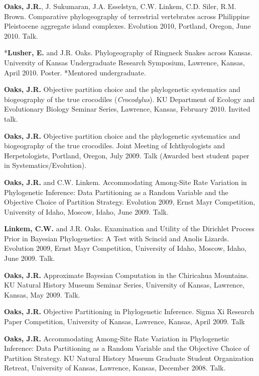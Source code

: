 \myHangIndent
{\bf Oaks, J.R.}, J. Sukumaran, J.A. Esselstyn, C.W. Linkem, C.D. Siler, R.M.
Brown.
Comparative phylogeography of terrestrial vertebrates across Philippine
Pleistocene aggregate island complexes.
Evolution 2010, Portland, Oregon, June 2010.
Talk.

\myHangIndent
*{\bf Lusher, E.} and J.R. Oaks.
Phylogeography of Ringneck Snakes across Kansas.
University of Kansas Undergraduate Research Symposium, Lawrence, Kansas, April
2010.
Poster.
*Mentored undergraduate.

\myHangIndent
{\bf Oaks, J.R.}
Objective partition choice and the phylogenetic systematics and biogeography of
the true crocodiles (\emph{Crocodylus}).
KU Department of Ecology and Evolutionary Biology Seminar Series, Lawrence,
Kansas, February 2010.
Invited talk.

\myHangIndent
{\bf Oaks, J.R.}
Objective partition choice and the phylogenetic systematics and biogeography of
the true crocodiles.
Joint Meeting of Ichthyologists and Herpetologists, Portland, Oregon, July
2009.
Talk (Awarded best student paper in Systematics/Evolution).

\myHangIndent
{\bf Oaks, J.R.} and C.W. Linkem.
Accommodating Among-Site Rate Variation in Phylogenetic Inference: Data
Partitioning as a Random Variable and the Objective Choice of Partition
Strategy.
Evolution 2009, Ernst Mayr Competition, University of Idaho, Moscow, Idaho,
June 2009.
Talk.

\myHangIndent
{\bf Linkem, C.W.} and J.R. Oaks.
Examination and Utility of the Dirichlet Process Prior in Bayesian
Phylogenetics: A Test with Scincid and Anolis Lizards.
Evolution 2009, Ernst Mayr Competition, University of Idaho, Moscow, Idaho,
June 2009.
Talk.

\myHangIndent
{\bf Oaks, J.R.}
Approximate Bayesian Computation in the Chiricahua Mountains.
KU Natural History Museum Seminar Series, University of Kansas, Lawrence,
Kansas, May 2009.
Talk.

\myHangIndent
{\bf Oaks, J.R.}
Objective Partitioning in Phylogenetic Inference.
Sigma Xi Research Paper Competition, University of Kansas, Lawrence, Kansas,
April 2009.
Talk

\myHangIndent
{\bf Oaks, J.R.}
Accommodating Among-Site Rate Variation in Phylogenetic Inference: Data
Partitioning as a Random Variable and the Objective Choice of Partition
Strategy.
KU Natural History Museum Graduate Student Organization Retreat, University of
Kansas, Lawrence, Kansas, December 2008.
Talk.

